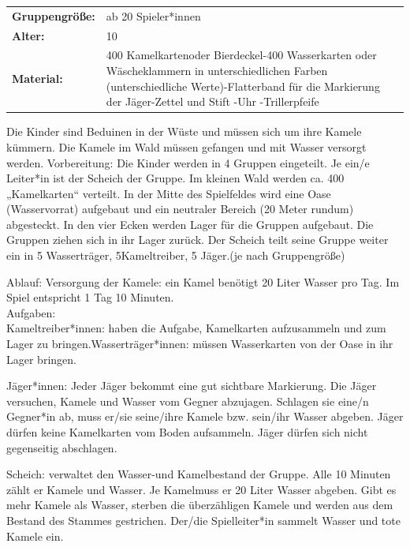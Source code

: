 \begin{table}[H]
\begin{tabular}{>{\bfseries}lp{8cm}}
   Gruppengröße:   & ab 20 Spieler*innen\\
    Alter: & 10 \\
    Material: &  400 Kamelkartenoder Bierdeckel-400 Wasserkarten oder Wäscheklammern in unterschiedlichen Farben (unterschiedliche Werte)-Flatterband für die Markierung der Jäger-Zettel und Stift -Uhr -Trillerpfeife\\ 
\end{tabular}
\end{table} 

Die Kinder sind Beduinen in der Wüste und müssen sich um ihre Kamele kümmern. Die Kamele im Wald müssen gefangen und mit Wasser versorgt werden. Vorbereitung: Die Kinder werden in 4 Gruppen eingeteilt. Je ein/e Leiter*in ist der Scheich der 
Gruppe. Im kleinen Wald werden ca. 400 „Kamelkarten“ verteilt. In der Mitte des Spielfeldes wird eine Oase (Wasservorrat) aufgebaut und ein neutraler Bereich (20 Meter rundum) abgesteckt. In den vier Ecken werden Lager für die Gruppen aufgebaut. Die Gruppen ziehen sich in ihr Lager zurück. Der Scheich teilt seine Gruppe weiter ein in 5 Wasserträger, 5Kameltreiber, 5 Jäger.(je nach Gruppengröße)

Ablauf: Versorgung der Kamele: ein Kamel benötigt 20 Liter Wasser pro Tag. Im Spiel entspricht 1 Tag 10 Minuten.\\

Aufgaben: \\ 

Kameltreiber*innen: haben die Aufgabe, Kamelkarten aufzusammeln und zum Lager zu bringen.Wasserträger*innen: müssen Wasserkarten von der Oase in ihr Lager bringen.

Jäger*innen: Jeder Jäger bekommt eine gut sichtbare Markierung. Die Jäger versuchen, Kamele und Wasser vom Gegner abzujagen. Schlagen sie eine/n Gegner*in ab, muss er/sie seine/ihre Kamele bzw. sein/ihr Wasser abgeben. Jäger dürfen keine Kamelkarten vom Boden aufsammeln. Jäger dürfen sich nicht gegenseitig abschlagen.

Scheich: verwaltet den Wasser-und Kamelbestand der Gruppe. Alle 10 Minuten zählt er Kamele und Wasser. Je Kamelmuss er 20 Liter Wasser abgeben. Gibt es mehr Kamele als Wasser, sterben die überzähligen Kamele und werden aus dem Bestand des Stammes gestrichen. Der/die Spielleiter*in sammelt Wasser und tote Kamele ein.


